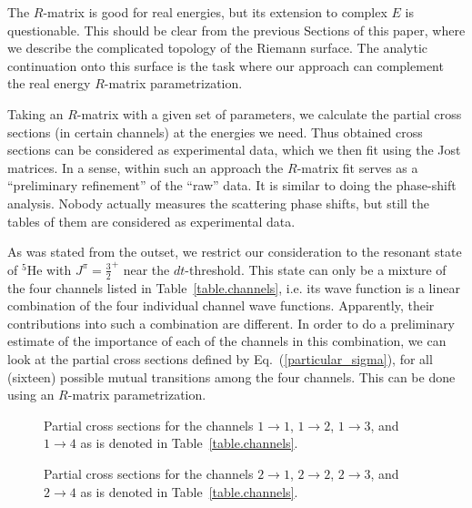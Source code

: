 \documentclass[12pt]{article}
\begin{document}
The $R$-matrix is good for real energies, but its extension to complex $E$ is
questionable. This should be clear from the previous Sections of this paper,
where we describe the complicated topology of the Riemann surface. The analytic
continuation onto this surface is the task where our approach can complement the
real energy $R$-matrix parametrization.

Taking an $R$-matrix with a given set of parameters, we calculate the
partial cross sections (in certain channels) at the energies we need. Thus
obtained cross sections can be considered
as experimental data, which we then fit using the Jost matrices. In a sense,
within such an approach the $R$-matrix fit serves as a ``preliminary
refinement'' of the ``raw'' data. It is similar to doing the phase-shift
analysis. Nobody actually measures the scattering phase shifts, but still the
tables of them are considered as experimental data.

As was stated from the outset, we restrict our consideration to the resonant
state of ${}^5\mathrm{He}$ with $J^\pi=\frac32^+$ near the $dt$-threshold. This
state can only be a mixture of the four channels listed in
Table~\ref{table.channels}, i.e. its wave function is a linear combination of
the four individual channel wave functions. Apparently, their contributions into
such a combination are different. In order to do a preliminary estimate of the
importance of each of the channels in this combination, we can look at the
partial cross sections defined by Eq.~(\ref{particular_sigma}), for all
(sixteen) possible mutual transitions among the four channels. This can be done
using an $R$-matrix parametrization.

\begin{figure}
\centerline{}
\caption{\sf
Partial cross sections for the channels $1\to1$, $1\to2$, $1\to3$, and $1\to4$
as is denoted in Table~\ref{table.channels}.
}
\label{fig.log1}
\end{figure}

\begin{figure}
\centerline{}
\caption{\sf
Partial cross sections for the channels $2\to1$, $2\to2$, $2\to3$, and $2\to4$
as is denoted in Table~\ref{table.channels}.
}
\label{fig.log2}
\end{figure}
\end{document}
